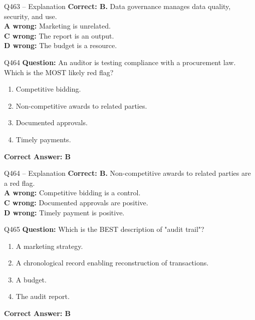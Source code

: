 \documentclass[aspectratio=169,10pt]{beamer}
\begin{document}
	\begin{frame}[t]{Q463 -- Explanation}
		\small
		\textbf{Correct: B.} Data governance manages data quality, security, and use. \\[4pt]
		\textbf{A wrong:} Marketing is unrelated. \\[2pt]
		\textbf{C wrong:} The report is an output. \\[2pt]
		\textbf{D wrong:} The budget is a resource.
	\end{frame}
	
	\begin{frame}[t]{Q464}
		\small
		\textbf{Question:} An auditor is testing compliance with a procurement law. Which is the MOST likely red flag?
		\begin{enumerate}[label=\Alph*.,itemsep=1pt,topsep=2pt]
			\item Competitive bidding.
			\item Non-competitive awards to related parties.
			\item Documented approvals.
			\item Timely payments.
		\end{enumerate}
		\vspace{4pt}
		\textbf{Correct Answer: B}
	\end{frame}
	
	\begin{frame}[t]{Q464 -- Explanation}
		\small
		\textbf{Correct: B.} Non-competitive awards to related parties are a red flag. \\[4pt]
		\textbf{A wrong:} Competitive bidding is a control. \\[2pt]
		\textbf{C wrong:} Documented approvals are positive. \\[2pt]
		\textbf{D wrong:} Timely payment is positive.
	\end{frame}
	
	\begin{frame}[t]{Q465}
		\small
		\textbf{Question:} Which is the BEST description of "audit trail"?
		\begin{enumerate}[label=\Alph*.,itemsep=1pt,topsep=2pt]
			\item A marketing strategy.
			\item A chronological record enabling reconstruction of transactions.
			\item A budget.
			\item The audit report.
		\end{enumerate}
		\vspace{4pt}
		\textbf{Correct Answer: B}
	\end{frame}
	
\end{document}
